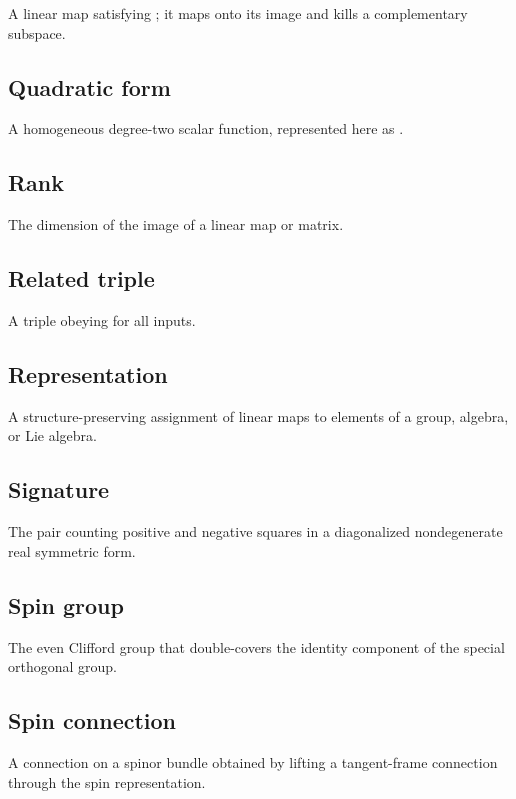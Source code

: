 \documentclass[11pt]{article}
\begin{document}
A linear map \texttt{} satisfying \texttt{}; it maps onto its image and kills a complementary subspace.

\subsection{Quadratic form}

A homogeneous degree-two scalar function, represented here as \texttt{}.

\subsection{Rank}

The dimension of the image of a linear map or matrix.

\subsection{Related triple}

A triple \texttt{} obeying \texttt{} for all inputs.

\subsection{Representation}

A structure-preserving assignment of linear maps to elements of a group, algebra, or Lie algebra.

\subsection{Signature}

The pair \texttt{} counting positive and negative squares in a diagonalized nondegenerate real symmetric form.

\subsection{Spin group}

The even Clifford group that double-covers the identity component of the special orthogonal group.

\subsection{Spin connection}

A connection on a spinor bundle obtained by lifting a tangent-frame connection through the spin representation.
\end{document}
